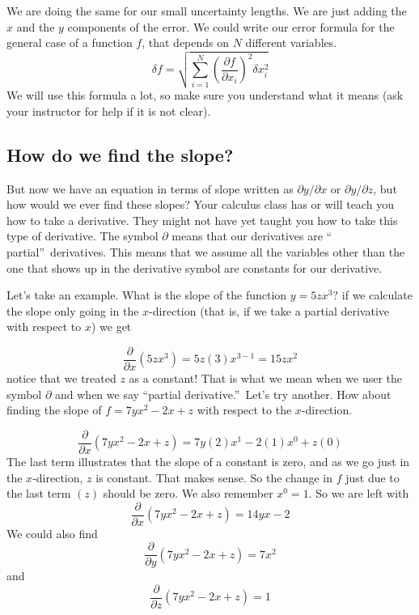 We are doing the same for our small uncertainty lengths. We are just adding
the $x$ and the $y$ components of the error. We could write our error
formula for the general case of a function $f$, that depends on $N$
different variables. 
\begin{equation*}
\delta f=\sqrt{\sum_{i=1}^{N}\left( \frac{\partial f}{\partial x_{i}}\right)
^{2}\delta x_{i}^{2}}
\end{equation*}%
We will use this formula a lot, so make sure you understand what it means
(ask your instructor for help if it is not clear).

\subsection{How do we find the slope?}

But now we have an equation in terms of slope written as $\partial
y/\partial x$ or $\partial y/\partial z$, but how would we ever find these
slopes? Your calculus class has or will teach you how to take a derivative.
They might not have yet taught you how to take this type of derivative. The
symbol $\partial $ means that our derivatives are \textquotedblleft
partial\textquotedblright\ derivatives. This means that we assume all the
variables other than the one that shows up in the derivative symbol are
constants for our derivative.

Let's take an example. What is the slope of the function $y=5zx^{3}?$ if we
calculate the slope only going in the $x$-direction (that is, if we take a
partial derivative with respect to $x$) we get

\begin{equation*}
\frac{\partial }{\partial x}\left( 5zx^{3}\right) =5z\left( 3\right)
x^{3-1}=15zx^{2}
\end{equation*}%
notice that we treated $z$ as a constant! That is what we mean when we user
the symbol $\partial $ and when we say \textquotedblleft partial
derivative.\textquotedblright\ Let's try another. How about finding the
slope of $f=7yx^{2}-2x+z$ with respect to the $x$-direction.

\begin{equation*}
\frac{\partial }{\partial x}\left( 7yx^{2}-2x+z\right) =7y\left( 2\right)
x^{1}-2(1)x^{0}+z\left( 0\right)
\end{equation*}%
The last term illustrates that the slope of a constant is zero, and as we go
just in the $x$-direction, $z$ is constant. That makes sense. So the change
in $f$ just due to the last term $(z)$ should be zero. We also remember $%
x^{0}=1.$ So we are left with 
\begin{equation*}
\frac{\partial }{\partial x}\left( 7yx^{2}-2x+z\right) =14yx-2
\end{equation*}%
We could also find 
\begin{equation*}
\frac{\partial }{\partial y}\left( 7yx^{2}-2x+z\right) =7x^{2}
\end{equation*}%
and%
\begin{equation*}
\frac{\partial }{\partial z}\left( 7yx^{2}-2x+z\right) =1
\end{equation*}

